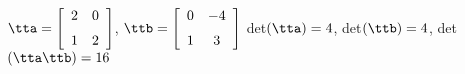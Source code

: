 {$\tta = \left[ \begin {array}{cc} 2&0\\\noalign{\medskip}1&2\end {array}\right] $, 
 \quad
$\ttb = \left[ \begin {array}{cc} 0&-4\\\noalign{\medskip}1&3\end {array} \right] $}
{det$(\tta)=4$, det$(\ttb)=4$, det$(\tta\ttb)=16$}






  

